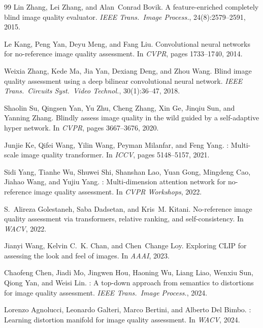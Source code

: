 \documentclass[sigconf]{acmart}
\begin{document}
\begin{thebibliography}{99}
Lin Zhang, Lei Zhang, and Alan~Conrad Bovik.
\newblock A feature-enriched completely blind image quality evaluator.
\newblock \textit{IEEE Trans.\ Image Process.}, 24(8):2579--2591, 2015.

Le Kang, Peng Yan, Deyu Meng, and Fang Liu.
\newblock Convolutional neural networks for no-reference image quality
  assessment.
\newblock In \textit{CVPR}, pages 1733--1740, 2014.

Weixia Zhang, Kede Ma, Jia Yan, Dexiang Deng, and Zhou Wang.
\newblock Blind image quality assessment using a deep bilinear convolutional
  neural network.
\newblock \textit{IEEE Trans.\ Circuits Syst.\ Video Technol.},
  30(1):36--47, 2018.

Shaolin Su, Qingsen Yan, Yu Zhu, Cheng Zhang, Xin Ge, Jinqiu Sun, and
  Yanning Zhang.
\newblock Blindly assess image quality in the wild guided by a self-adaptive
  hyper network.
\newblock In \textit{CVPR}, pages 3667--3676, 2020.

Junjie Ke, Qifei Wang, Yilin Wang, Peyman Milanfar, and Feng Yang.
: Multi-scale image quality transformer.
\newblock In \textit{ICCV}, pages 5148--5157, 2021.

Sidi Yang, Tianhe Wu, Shuwei Shi, Shanshan Lao, Yuan Gong, Mingdeng Cao,
  Jiahao Wang, and Yujiu Yang.
: Multi-dimension attention network for no-reference image
  quality assessment.
\newblock In \textit{CVPR Workshops}, 2022.

S.~Alireza Golestaneh, Saba Dadsetan, and Kris~M. Kitani.
\newblock No-reference image quality assessment via transformers, relative
  ranking, and self-consistency.
\newblock In \textit{WACV}, 2022.

Jianyi Wang, Kelvin C.~K. Chan, and Chen~Change Loy.
\newblock Exploring {CLIP} for assessing the look and feel of images.
\newblock In \textit{AAAI}, 2023.

Chaofeng Chen, Jiadi Mo, Jingwen Hou, Haoning Wu, Liang Liao, Wenxiu Sun,
  Qiong Yan, and Weisi Lin.
: A top-down approach from semantics to distortions for image
  quality assessment.
\newblock \textit{IEEE Trans.\ Image Process.}, 2024.

Lorenzo Agnolucci, Leonardo Galteri, Marco Bertini, and Alberto Del Bimbo.
: Learning distortion manifold for image quality assessment.
\newblock In \textit{WACV}, 2024.


\end{thebibliography}
\end{document}
